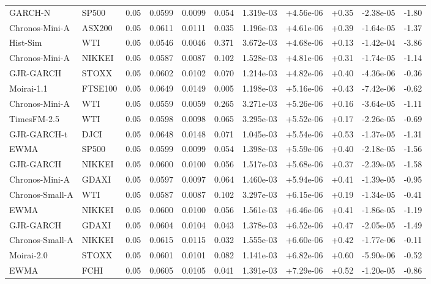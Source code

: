 \begin{tabular}{llrrrrrrrrr}
GARCH-N & SP500 & 0.05 & 0.0599 & 0.0099 & 0.054 & 1.319e-03 & +4.56e-06 & +0.35 & -2.38e-05 & -1.80 \\
Chronos-Mini-A & ASX200 & 0.05 & 0.0611 & 0.0111 & 0.035 & 1.196e-03 & +4.61e-06 & +0.39 & -1.64e-05 & -1.37 \\
Hist-Sim & WTI & 0.05 & 0.0546 & 0.0046 & 0.371 & 3.672e-03 & +4.68e-06 & +0.13 & -1.42e-04 & -3.86 \\
Chronos-Mini-A & NIKKEI & 0.05 & 0.0587 & 0.0087 & 0.102 & 1.528e-03 & +4.81e-06 & +0.31 & -1.74e-05 & -1.14 \\
GJR-GARCH & STOXX & 0.05 & 0.0602 & 0.0102 & 0.070 & 1.214e-03 & +4.82e-06 & +0.40 & -4.36e-06 & -0.36 \\
Moirai-1.1 & FTSE100 & 0.05 & 0.0649 & 0.0149 & 0.005 & 1.198e-03 & +5.16e-06 & +0.43 & -7.42e-06 & -0.62 \\
Chronos-Mini-A & WTI & 0.05 & 0.0559 & 0.0059 & 0.265 & 3.271e-03 & +5.26e-06 & +0.16 & -3.64e-05 & -1.11 \\
TimesFM-2.5 & WTI & 0.05 & 0.0598 & 0.0098 & 0.065 & 3.295e-03 & +5.52e-06 & +0.17 & -2.26e-05 & -0.69 \\
GJR-GARCH-t & DJCI & 0.05 & 0.0648 & 0.0148 & 0.071 & 1.045e-03 & +5.54e-06 & +0.53 & -1.37e-05 & -1.31 \\
EWMA & SP500 & 0.05 & 0.0599 & 0.0099 & 0.054 & 1.398e-03 & +5.59e-06 & +0.40 & -2.18e-05 & -1.56 \\
GJR-GARCH & NIKKEI & 0.05 & 0.0600 & 0.0100 & 0.056 & 1.517e-03 & +5.68e-06 & +0.37 & -2.39e-05 & -1.58 \\
Chronos-Mini-A & GDAXI & 0.05 & 0.0597 & 0.0097 & 0.064 & 1.460e-03 & +5.94e-06 & +0.41 & -1.39e-05 & -0.95 \\
Chronos-Small-A & WTI & 0.05 & 0.0587 & 0.0087 & 0.102 & 3.297e-03 & +6.15e-06 & +0.19 & -1.34e-05 & -0.41 \\
EWMA & NIKKEI & 0.05 & 0.0600 & 0.0100 & 0.056 & 1.561e-03 & +6.46e-06 & +0.41 & -1.86e-05 & -1.19 \\
GJR-GARCH & GDAXI & 0.05 & 0.0604 & 0.0104 & 0.043 & 1.378e-03 & +6.52e-06 & +0.47 & -2.05e-05 & -1.49 \\
Chronos-Small-A & NIKKEI & 0.05 & 0.0615 & 0.0115 & 0.032 & 1.555e-03 & +6.60e-06 & +0.42 & -1.77e-06 & -0.11 \\
Moirai-2.0 & STOXX & 0.05 & 0.0601 & 0.0101 & 0.082 & 1.141e-03 & +6.82e-06 & +0.60 & -5.90e-06 & -0.52 \\
EWMA & FCHI & 0.05 & 0.0605 & 0.0105 & 0.041 & 1.391e-03 & +7.29e-06 & +0.52 & -1.20e-05 & -0.86 \\

\end{tabular}
